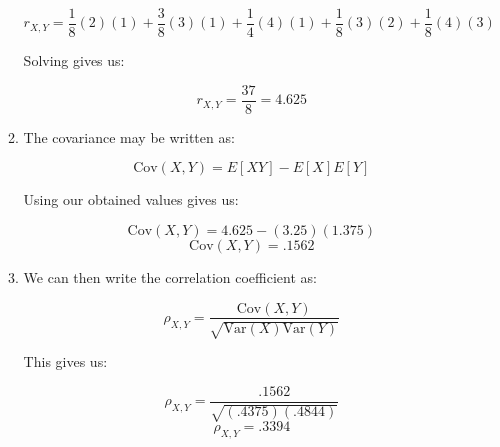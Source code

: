 \begin{enumerate}
\begin{enumerate}
        $$r_{X,Y}=\frac{1}{8}(2)(1)+\frac{3}{8}(3)(1)+\frac{1}{4}(4)(1)+\frac{1}{8}(3)(2)+\frac{1}{8}(4)(3)$$

        Solving gives us:

        $$\boxed{r_{X,Y}=\frac{37}{8}=4.625}$$

      \item The covariance may be written as:

        $$\text{Cov}(X,Y)=E[XY]-E[X]E[Y]$$

        Using our obtained values gives us:

        $$\text{Cov}(X,Y)=4.625-\left( 3.25 \right)(1.375)$$
        $$\boxed{\text{Cov}(X,Y)=.1562}$$

      \item We can then write the correlation coefficient as:

        $$\rho_{X,Y}=\frac{\text{Cov}(X,Y)}{\sqrt{\text{Var}(X)\text{Var}(Y)}}$$

        This gives us:

        $$\rho_{X,Y}=\frac{.1562}{\sqrt{(.4375)(.4844)}}$$
        $$\boxed{\rho_{X,Y}=.3394}$$

    \end{enumerate}

\end{enumerate}



